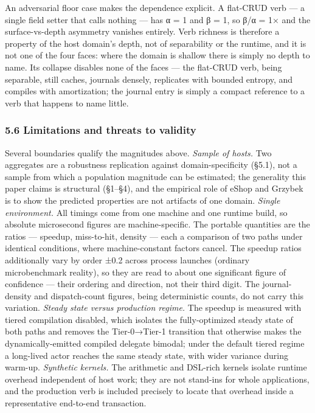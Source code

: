 \documentclass[
]{article}
\newcounter{none} %
\begin{document}
An adversarial floor case makes the dependence explicit. A flat-CRUD
verb --- a single field setter that calls nothing --- has α = 1 and β =
1, so β/α = 1× and the surface-vs-depth asymmetry vanishes entirely.
Verb richness is therefore a property of the host domain's depth, not of
separability or the runtime, and it is not one of the four faces: where
the domain is shallow there is simply no depth to name. Its collapse
disables none of the faces --- the flat-CRUD verb, being separable,
still caches, journals densely, replicates with bounded entropy, and
compiles with amortization; the journal entry is simply a compact
reference to a verb that happens to name little.

\subsubsection{5.6 Limitations and threats to
validity}\label{limitations-and-threats-to-validity}

Several boundaries qualify the magnitudes above. \emph{Sample of hosts.}
Two aggregates are a robustness replication against domain-specificity
(§5.1), not a sample from which a population magnitude can be estimated;
the generality this paper claims is structural (§1--§4), and the
empirical role of eShop and Grzybek is to show the predicted properties
are not artifacts of one domain. \emph{Single environment.} All timings
come from one machine and one runtime build, so absolute microsecond
figures are machine-specific. The portable quantities are the ratios ---
speedup, miss-to-hit, density --- each a comparison of two paths under
identical conditions, where machine-constant factors cancel. The speedup
ratios additionally vary by order ±0.2 across process launches (ordinary
microbenchmark reality), so they are read to about one significant
figure of confidence --- their ordering and direction, not their third
digit. The journal-density and dispatch-count figures, being
deterministic counts, do not carry this variation. \emph{Steady state
versus production regime.} The speedup is measured with tiered
compilation disabled, which isolates the fully-optimized steady state of
both paths and removes the Tier-0→Tier-1 transition that otherwise makes
the dynamically-emitted compiled delegate bimodal; under the default
tiered regime a long-lived actor reaches the same steady state, with
wider variance during warm-up. \emph{Synthetic kernels.} The arithmetic
and DSL-rich kernels isolate runtime overhead independent of host work;
they are not stand-ins for whole applications, and the production verb
is included precisely to locate that overhead inside a representative
end-to-end transaction.
\end{document}
